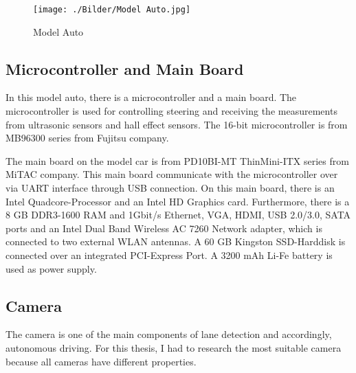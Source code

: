 \begin{figure}[H]
	\centering
	\hspace*{0cm}   
	\texttt{[image: ./Bilder/Model Auto.jpg]}
	\caption{Model Auto}
\end{figure}

%
\subsection{Microcontroller and Main Board}\label{sec:Microcontroller and Main Board}


In this model auto, there is a microcontroller and a main board. The microcontroller is used for controlling steering 
and receiving the measurements from ultrasonic sensors and hall effect sensors. The 16-bit microcontroller is from 
MB96300 series from Fujitsu company.

The main board on the model car is from PD10BI-MT ThinMini-ITX series from MiTAC company. This main board communicate 
with the microcontroller over via UART interface through USB connection. On this main board, there is an Intel 
Quadcore-Processor and an Intel HD Graphics card. Furthermore, there is a 8 GB DDR3-1600 RAM and 1Gbit/s Ethernet, VGA, HDMI, USB 2.0/3.0, SATA ports and an Intel Dual Band Wireless AC 7260 Network adapter, which is connected to two external WLAN antennas. A 60 GB Kingston SSD-Harddisk is connected over an integrated PCI-Express Port. A 3200 mAh Li-Fe battery is used as power supply.
%

\subsection{Camera}\label{sec:Camera}


The camera is one of the main components of lane detection and accordingly, autonomous driving. For this thesis, I had 
to research the most suitable camera because all cameras have different properties.

